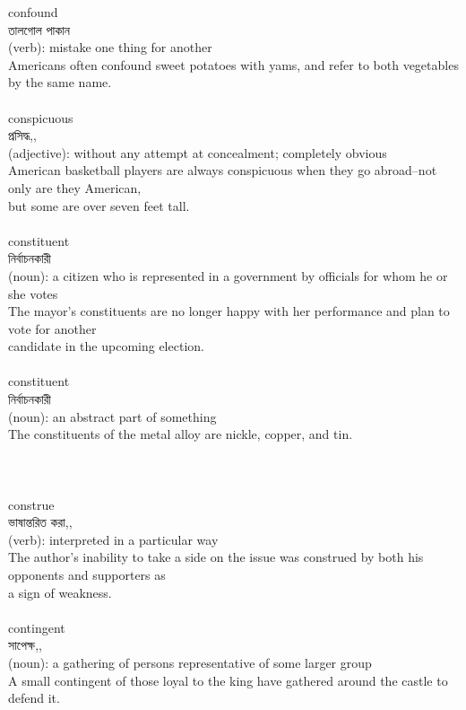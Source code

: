 \documentclass{article}
\begin{document}
{confound}\\
{তালগোল পাকান}\\
{(verb): mistake one thing for another\\Americans often confound sweet potatoes with yams, and refer to both vegetables by the same name.\\}\\
{conspicuous}\\
{প্রসিদ্ধ,,}\\
{(adjective): without any attempt at concealment; completely obvious\\American basketball players are always conspicuous when they go abroad--not only are they American,\\but some are over seven feet tall.\\}\\
{constituent}\\
{নির্বাচনকারী}\\
{(noun): a citizen who is represented in a government by officials for whom he or she votes\\The mayor's constituents are no longer happy with her performance and plan to vote for another\\candidate in the upcoming election.\\}\\
{constituent}\\
{নির্বাচনকারী}\\
{(noun): an abstract part of something\\The constituents of the metal alloy are nickle, copper, and tin.\\\\                                                                                 \\}\\
{construe}\\
{ভাষান্তরিত করা,,}\\
{(verb): interpreted in a particular way\\The author's inability to take a side on the issue was construed by both his opponents and supporters as\\a sign of weakness.\\}\\
{contingent}\\
{সাপেক্ষ,,}\\
{(noun): a gathering of persons representative of some larger group\\A small contingent of those loyal to the king have gathered around the castle to defend it.\\}\\
\end{document}
